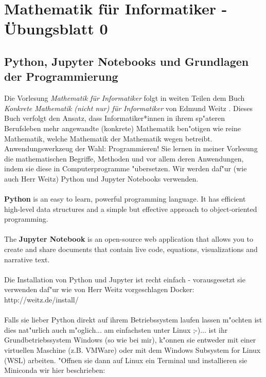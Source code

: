 \documentclass{article}
\begin{document}
\section*{Mathematik f\"ur Informatiker - \"Ubungsblatt 0}
\subsection*{Python, Jupyter Notebooks und Grundlagen der Programmierung}
Die Vorlesung \textit{Mathematik f\"ur Informatiker} folgt in weiten Teilen dem Buch \textit{Konkrete Mathematik (nicht nur) f\"ur Informatiker} von Edmund Weitz \cite{weitz}. Dieses Buch verfolgt den Ansatz, dass Informatiker*innen in ihrem sp"ateren Berufsleben mehr angewandte (konkrete) Mathematik ben"otigen wie \glqq reine\grqq{} Mathematik, welche Mathematik der Mathematik wegen betreibt. Anwendungswerkzeug der Wahl: Programmieren! Sie lernen in meiner Vorlesung die mathematischen Begriffe, Methoden und vor allem deren Anwendungen, indem sie diese in Computerprogramme \glqq "ubersetzen\grqq. Wir werden daf"ur (wie auch Herr Weitz) Python und Jupyter Notebooks verwenden. 
\\\\
\textbf{Python} is an easy to learn, powerful programming language. It has efficient high-level data structures and a simple but effective approach to object-oriented programming. \cite{pythonwebsite}
\\\\
The \textbf{Jupyter Notebook} is an open-source web application that allows you to create and share documents that contain live code, equations, visualizations and narrative text. \cite{jupyterwebsite}
\\\\
Die Installation von Python und Jupyter ist recht einfach - vorausgesetzt sie verwenden daf"ur wie von Herr Weitz vorgeschlagen Docker: 
\\

http://weitz.de/install/
\\\\
Falls sie lieber Python direkt auf ihrem Betriebssystem laufen lassen m"ochten ist dies nat"urlich auch m"oglich... am einfachsten unter Linux ;-)... ist ihr Grundbetriebssystem Windows (so wie bei mir), k"onnen sie entweder mit einer virtuellen Maschine (z.B. VMWare) oder mit dem Windows Subsystem for Linux (WSL) arbeiten. "Offnen sie dann auf Linux ein Terminal und installieren sie Miniconda wir hier beschrieben: 
\\
\end{document}
